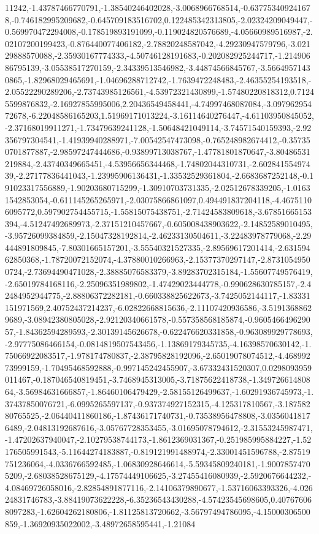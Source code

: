 \documentclass{article}
\begin{document}
11242,-1.43787466770791,-1.38540246402028,-3.0068966768514,-0.637753409241678,-0.746182995209682,-0.645709183516702,0.122485342313805,-2.02324209049447,-0.569970472294008,-0.178519893191099,-0.119024820576689,-4.05660989516987,-2.02107200199423,-0.876440077406182,-2.78820248587042,-4.29230947579796,-3.02129888570088,-2.35930167774333,-4.50746128191683,-0.202082925244717,-1.21490686795139,-3.05538517270159,-2.34339513546982,-3.44874566845767,-3.56649571430865,-1.82968029465691,-1.04696288712742,-1.7639472248483,-2.46355254193518,-2.05522290289206,-2.73743985126561,-4.53972321430899,-1.57480220818312,0.71245599876832,-2.16927855995006,2.20436549458441,-4.74997468087084,-3.09796295472678,-6.22048586165203,1.51969171013224,-3.16114640276447,-4.61103950845052,-2.37168019911271,-1.73479639241128,-1.50648421049114,-3.74571540159393,-2.92356797304541,-1.41939940288971,-7.00542547473098,-0.765248982674412,-0.357350701877887,-2.98597247444686,-0.93899713038767,-1.47781801870647,-3.80486531219884,-2.43740349665451,-4.53956656344468,-1.74802044310731,-2.60284155497439,-2.27177836441043,-1.23995906136431,-1.33532529361804,-2.6683687252148,-0.191023317556889,-1.90203680715299,-1.30910703731335,-2.02512678339205,-1.01631542853054,-0.611145265265971,-2.03075866861097,0.494491837204118,-4.46751106095772,0.597902754455715,-1.55815075438751,-2.71424583809618,-3.67851665153394,-4.51247492689973,-2.37151210457667,-0.605008438903622,-2.14852589010495,-3.95726099384859,-2.15047328192814,-2.46233130504611,-3.22483978779068,-2.29444891809845,-7.80301665157201,-3.55540321527335,-2.89569617201414,-2.63159462850368,-1.78720072152074,-4.37880010266963,-2.15377370297147,-2.87310549500724,-2.73694490471028,-2.38885076583379,-3.89283702315184,-1.55607749576419,-2.65019784168116,-2.25096351989802,-1.47429023444778,-0.990628630785157,-2.42484952944775,-2.88806372282181,-0.660338825622673,-3.7425052144117,-1.83331151971569,2.40752437214237,-6.02822668815636,-2.11107420936586,-3.51913688629689,-3.08942380805028,-2.92120340661578,-0.557358568185874,-0.960546649629057,-1.84362594289593,-2.30139145626678,-0.622476620331858,-0.963089929778693,-2.97775086466154,-0.0814819507543456,-1.13869179345735,-4.16398570630142,-1.75066922083517,-1.978174780837,-2.38795828192096,-2.65019078074512,-4.46899273999159,-1.70495468592888,-0.997145242455907,-3.67332431520307,0.0298093959011467,-0.187046540819451,-3.7468945313005,-3.71875622418738,-1.34972661480864,-3.56984631666857,-1.86460106479429,-2.58155126499637,-1.60291936745973,-1.37437850076721,-6.0995265597137,-0.937374927152315,-4.125317810567,-3.18758280765525,-2.06440411860186,-1.87436171740731,-0.73538956478808,-3.03560418176489,-2.04813192687616,-3.05767728353455,-3.01695078794612,-2.31553245987471,-1.47202637940047,-2.10279538744173,-1.8612369031367,-0.251985995884227,-1.52176505991543,-5.11644274183887,-0.819121991488974,-2.33001451596788,-2.87519751236064,-4.0336766592485,-1.06830928646614,-5.59345809240181,-1.90078574705209,-2.68038528675129,-4.17574449106625,-3.27455416080939,-2.5920676644232,-4.08469726058016,-2.82854891877116,-2.14106379890677,-1.53716063393326,-4.02624831746783,-3.88419073622228,-6.35236543430288,-4.57423545698605,0.407676068097283,-1.62604262180806,-1.81125813720662,-3.56797494786095,-4.15000306500859,-1.36920935022002,-3.48972658595441,-1.21084
\end{document}
